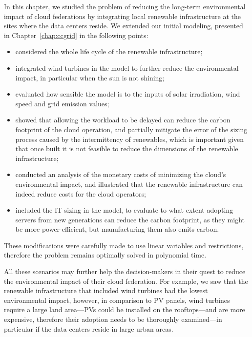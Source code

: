In this chapter, we studied the problem of reducing the long-term environmental impact of cloud federations by integrating local renewable infrastructure at the sites where the data centers reside. We extended our initial modeling, presented in Chapter~\ref{chap:ccgrid} in the following points: 
\begin{itemize}
    \item considered the whole life cycle of the renewable infrastructure; 
    \item integrated wind turbines in the model to further reduce the environmental impact, in particular when the sun is not shining;
    \item evaluated how sensible the model is to the inputs of solar irradiation, wind speed and grid emission values;
    \item showed that allowing the workload to be delayed can reduce the carbon footprint of the cloud operation, and partially mitigate the error of the sizing process caused by the intermittency of renewables, which is important given that once built it is not feasible to reduce the dimensions of the renewable infrastructure;
    \item conducted an analysis of the monetary costs of minimizing the cloud's  environmental impact, and illustrated that the renewable infrastructure can indeed  reduce costs for the cloud operators;
    \item included the IT sizing in the model, to evaluate to what extent adopting servers from new generations can reduce the carbon footprint, as they might be more power-efficient, but manufacturing them also emits carbon. 
\end{itemize}

These modifications were carefully made to use linear variables and restrictions, therefore the problem remains optimally solved in polynomial time.

All these scenarios may further help the decision-makers in their quest to reduce the environmental impact of their cloud federation. For example, we saw that the renewable infrastructure that included wind turbines had the lowest environmental impact, however, in comparison to PV panels, wind turbines require a large land area---PVs could be installed on the rooftops---and are more expensive, therefore their adoption needs to be thoroughly examined---in particular if the data centers reside in large urban areas. 

